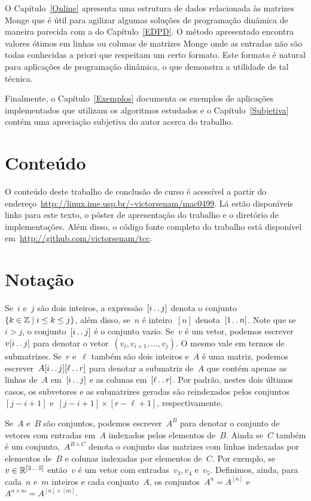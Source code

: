 O Capítulo~\ref{Online} apresenta uma estrutura de dados relacionada às matrizes Monge que é útil para agilizar algumas soluções de programação dinâmica de maneira parecida com a do Capítulo~\ref{EDPD}. O método apresentado encontra valores ótimos em linhas ou colunas de matrizes Monge onde as entradas não são todas conhecidas a priori que respeitam um certo formato. Este formato é natural para aplicações de programação dinâmica, o que demonstra a utilidade de tal técnica.

Finalmente, o Capítulo~\ref{Exemplos} documenta os exemplos de aplicações implementados que utilizam os algoritmos estudados e o Capítulo~\ref{Subjetiva} contém uma apreciação subjetiva do autor acerca do trabalho.

\section{Conteúdo}
O conteúdo deste trabalho de conclusão de curso é acessível a partir do endereço~\href{http://linux.ime.usp.br/~victorsenam/mac0499}{http://linux.ime.usp.br/\textasciitilde{}victorsenam/mac0499}. Lá estão disponíveis links para este texto, o pôster de apresentação do trabalho e o diretório de implementações. Além disso, o código fonte completo do trabalho está disponível em~\href{http://github.com/victorsenam/tcc}{http://github.com/victorsenam/tcc}.

\section{Notação}
Se~$i$ e~$j$ são dois inteiros, a expressão~$[i \,.\,.\, j]$ denota o conjunto~${ \{ k \in \mathbb{Z} \mid i \leq k \leq j \} }$, além disso, se~$n$ é inteiro~$[n]$ denota~$[1 \,.\,.\, n]$. Note que se~$i > j$, o conjunto~$[i \,.\,.\, j]$ é o conjunto vazio. Se~$v$ é um vetor, podemos escrever~$v[i \,.\,.\, j]$ para denotar o vetor~${ (v_i, v_{i+1}, \dots, v_j) }$. O mesmo vale em termos de submatrizes. Se~$r$ e~$\ell$ também são dois inteiros e~$A$ é uma matriz, podemos escrever~$A[i \,.\,.\, j][\ell \,.\,.\, r]$ para denotar a submatriz de~$A$ que contém apenas as linhas de~$A$ em~$[i \,.\,.\, j]$ e as colunas em~$[\ell \,.\,.\, r]$. Por padrão, nestes dois últimos casos, os subvetores e as submatrizes geradas são reindexados pelos conjuntos~$[j - i + 1]$ e~${ [j - i + 1] \times [r - \ell + 1] }$, respectivamente.

Se~$A$ e~$B$ são conjuntos, podemos escrever~$A^B$ para denotar o conjunto de vetores com entradas em~$A$ indexados pelos elementos de~$B$. Ainda se~$C$ também é um conjunto,~$A^{B \times C}$ denota o conjunto das matrizes com linhas indexadas por elementos de~$B$ e colunas indexadas por elementos de~$C$. Por exemplo, se~$v \in \mathbb{R}^{ [3 \,.\,.\, 5] }$ então~$v$ é um vetor com entradas~${ v_3, v_4 }$ e~$v_5$. Definimos, ainda, para cada~$n$ e~$m$ inteiros e cada conjunto~$A$, os conjuntos~${ A^n = A^{ [n] } }$ e~${ A^{n \times m} = A^{[n] \times [m]} }$.

